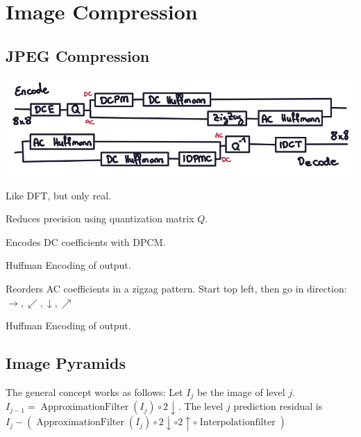 \section{Image Compression}
\subsection{JPEG Compression}

\includegraphics*[width=\linewidth]{assets/jpeg.png}

\begin{definition}
  Like DFT, but only real.
\end{definition}

\begin{definition}[Quantization]
  Reduces precision using  quantization matrix \(Q\).
\end{definition}

\begin{definition}
  Encodes DC coefficients with DPCM.
\end{definition}

\begin{definition}
  Huffman Encoding of output.
\end{definition}

\begin{definition}
  Reorders AC coefficients in a zigzag pattern.
  Start top left, then go in direction: \(\rightarrow, \swarrow, \downarrow, \nearrow\)
\end{definition}

\begin{definition}
  Huffman Encoding of output.
\end{definition}

\subsection{Image Pyramids}

The general concept works as follows: Let $I_j$ be the image of level $j$. $I_{j-1} = \operatorname{ApproximationFilter}(I_j) \circ 2 \downarrow$. The level $j$ prediction residual is $I_j - (\operatorname{ApproximationFilter}(I_j) \circ 2 \downarrow \circ 2 \uparrow \circ \operatorname{Interpolation filter})$

